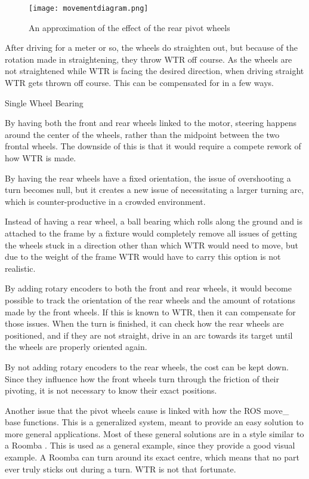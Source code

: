 \begin{figure}[H]

\texttt{[image: movementdiagram.png]}
\caption{An approximation of the effect of the rear pivot wheels}
\label{fig::mvmnt}
\end{figure}
After driving for a meter or so, the wheels do straighten out, but because of the rotation made in straightening, they throw WTR off course.
As the wheels are not straightened while WTR is facing the desired direction, when driving straight WTR gets thrown off course.
This can be compensated for in a few ways.

\begin{labeling}{Single Wheel Bearing}
\item [Tank Controls] By having both the front and rear wheels linked to the motor, steering happens around the center of the wheels, rather than the midpoint between the two frontal wheels. The downside of this is that it would require a compete rework of how WTR is made.
\item [Fixed Rear Wheels] By having the rear wheels have a fixed orientation, the issue of overshooting a turn becomes null, but it creates a new issue of necessitating a larger turning arc, which is counter-productive in a crowded environment.
\item [Single Wheel Bearing] Instead of having a rear wheel, a ball bearing which rolls along the ground and is attached to the frame by a fixture would completely remove all issues of getting the wheels stuck in a direction other than which WTR would need to move, but due to the weight of the frame WTR would have to carry this option is not realistic.
\item [Rotary Encoders] By adding rotary encoders to both the front and rear wheels, it would become possible to track the orientation of the rear wheels and the amount of rotations made by the front wheels. If this is known to WTR, then it can compensate for those issues. When the turn is finished, it can check how the rear wheels are positioned, and if they are not straight, drive in an arc towards its target until the wheels are properly oriented again. 
\item [Front wheel encoders] By not adding rotary encoders to the rear wheels, the cost can be kept down. Since they influence how the front wheels turn through the friction of their pivoting, it is not necessary to know their exact positions.
\end{labeling}

Another issue that the pivot wheels cause is linked with how the ROS move\_ base functions.
This is a generalized system, meant to provide an easy solution to more general applications.
Most of these general solutions are in a style similar to a Roomba \cite{roomba}.
This is used as a general example, since they provide a good visual example.
A Roomba can turn around its exact centre, which means that no part ever truly sticks out during a turn.
WTR is not that fortunate.


